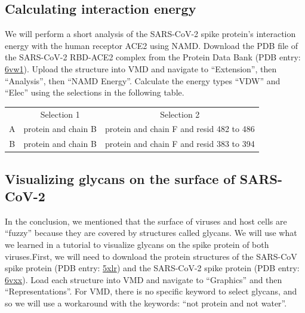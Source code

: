 \subsection{Calculating interaction energy}

We will perform a short analysis of the SARS-CoV-2 spike protein's interaction energy with the human receptor ACE2 using NAMD. Download the PDB file of the SARS-CoV-2 RBD-ACE2 complex from the Protein Data Bank (PDB entry: \href{https://www.rcsb.org/structure/6vw1}{6vw1}). Upload the structure into VMD and navigate to ``Extension'', then ``Analysis'', then ``NAMD Energy''. Calculate the energy types ``VDW'' and ``Elec'' using the selections in the following table.

\begin{center}
\mySfFamily
\begin{tabular}{c c c}
& Selection 1 & Selection 2\\
A & protein and chain B & protein and chain F and resid 482 to 486\\
B & protein and chain B & protein and chain F and resid 383 to 394
\end{tabular}
\end{center}

\begin{exercise}\end{exercise}

\subsection{Visualizing glycans on the surface of SARS-CoV-2}

In the conclusion, we mentioned that the surface of viruses and host cells are ``fuzzy'' because they are covered by structures called glycans. We will use what we learned in a tutorial to visualize glycans on the spike protein of both viruses. First, we will need to download the protein structures of the SARS-CoV spike protein (PDB entry: \href{https://www.rcsb.org/structure/5xlr}{5xlr}) and the SARS-CoV-2 spike protein (PDB entry: \href{https://www.rcsb.org/structure/6vxx}{6vxx}). Load each structure into VMD and navigate to ``Graphics'' and then ``Representations''. For VMD, there is no specific keyword to select glycans, and so we will use a workaround with the keywords: ``not protein and not water''.\\

